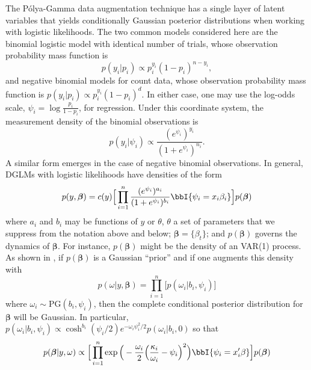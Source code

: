 \documentclass[11pt]{article}
\newcommand{\Polya}{P\'{o}lya}
\newcommand{\PG}{\text{PG}}
\newcommand{\bbeta}{\boldsymbol{\beta}}
\begin{document}
The \Polya-Gamma data augmentation technique has a single layer of latent
variables that yields conditionally Gaussian posterior distributions when
working with logistic likelihoods.  The two common models considered here are
the binomial logistic model with identical number of trials, whose observation
probability mass function is
\[
p(y_i | p_i) \propto p_i^{y_i} (1-p_i)^{n - y_i},
\]
and negative binomial models for count data, whose observation probability mass
function is \( p(y_i | p_i) \propto p_i^{y_i} (1-p_i)^{d}.  \) In either case,
one may use the log-odds scale, $\psi_i = \log \frac{p_i}{1-p_i}$, for
regression.  Under this coordinate system, the measurement density of the
binomial observations is
\[
p(y_i | \psi_i) \propto \frac{(e^{\psi_i})^{y_i}}{(1+e^{\psi_i})^{n_i}}.
\]
A similar form emerges in the case of negative binomial observations.  In
general, DGLMs with logistic likelihoods have densities of the form
\[
p(y, \bbeta) = c(y) \Big[ \prod_{i=1}^n
\frac{(e^{\psi_i})^{a_i}}{(1+e^{\psi_i})^{b_i}} \bbI \{\psi_i = x_i \beta_i\}
\Big] p(\bbeta)
\]
where $a_i$ and $b_i$ may be functions of $y$ or $\theta$, $\theta$ a set of
parameters that we suppress from the notation above and below; $\bbeta =
\{\beta_t\}$; and $p(\bbeta)$ governs the dynamics of $\bbeta$.  For instance,
$p(\bbeta)$ might be the density of an VAR(1) process.  As shown in
\cite{polson-etal-2012}, if $p(\bbeta)$ is a Gaussian ``prior'' and if one
augments this density with
\begin{equation}
\label{eqn:augmentation}
p(\omega | y, \bbeta) = \prod_{i=1}^n \Big[ p(\omega_i | b_i, \psi_i)
\Big]
\end{equation}
where $\omega_i \sim \PG(b_i, \psi_i)$, then the complete conditional posterior
distribution for $\bbeta$ will be Gaussian.  In particular, $p(\omega_i | b_i,
\psi_i) \propto \cosh^{b_i}(\psi_i/2) e^{-\omega_i \psi_i^2 / 2} p(\omega_i |
b_i, 0)$ so that
\[
p(\bbeta | y, \omega) 
\propto 
\Big[ \prod_{i=1}^n \exp 
\Big(-\frac{\omega_i}{2} \Big(\frac{\kappa_i}{\omega_i} - \psi_i\Big)^2 \Big)
\bbI \{\psi_i = x_i' \beta\} \Big] p(\bbeta)
\]
\end{document}
